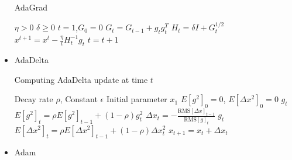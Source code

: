 \documentclass{article}
\begin{document}
\begin{itemize}
    \begin{algorithm}[H]
      \caption{AdaGrad}
      \begin{algorithmic}[1]
        \Require  $\eta>0$ $\delta \geq 0$
        \State  $t=1$,$G_{0}=0$
          \State $G_t = G_{t-1}+ g_t g_t^T$
          \State $H_t = \delta I + G_t^{1/2}$
          \State $x^{t+1} = x^t - \frac{\eta}{t} H_t^{-1} g_t$
          \State $t=t+1$
        \EndWhile
      \end{algorithmic}
    \end{algorithm}


  \item AdaDelta

    \begin{algorithm}[H]
      \caption{Computing AdaDelta update at time $t$}
      \begin{algorithmic}[1]
        \Require Decay rate $\rho$, Constant $\epsilon$
        \Require Initial parameter $x_1$
        \State $E[g^2]_0 = 0$, $E[\Delta x^2]_0 = 0$ 
          \State $g_t$ 
          \State $E[g^2]_t = \rho E[g^2]_{t-1} + (1-\rho) g_t^2$ 
          \State $\Delta x_t = - \frac{\text{RMS}[\Delta x]_{t-1}}{\text{RMS}[g]_t} \; g_t$ 
          \State $E[\Delta x^2]_t = \rho E[\Delta x^2]_{t-1} + (1-\rho) \Delta x_t^2$ 
          \State $x_{t+1} = x_t + \Delta x_t$ 
        \EndFor
      \end{algorithmic}
    \end{algorithm}

  \item Adam


\end{itemize}
\end{document}
